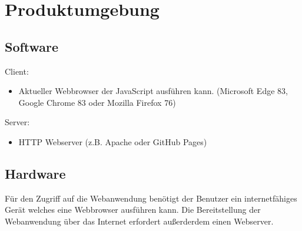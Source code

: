 \section{Produktumgebung}

\subsection{Software}

Client:
\begin{itemize}
    \item Aktueller \gls{Webbrowser} der JavaScript ausführen kann. (Microsoft Edge 83, Google Chrome 83 oder Mozilla Firefox 76)
\end{itemize}
Server:
\begin{itemize}
    \item HTTP \gls{Webserver} (z.B. Apache oder GitHub Pages)
\end{itemize}

\subsection{Hardware}

Für den Zugriff auf die \gls{Webanwendung} benötigt der Benutzer ein internetfähiges Gerät welches eine \gls{Webbrowser} ausführen kann.  
Die Bereitstellung der \gls{Webanwendung} über das Internet erfordert außerderdem einen \gls{Webserver}.